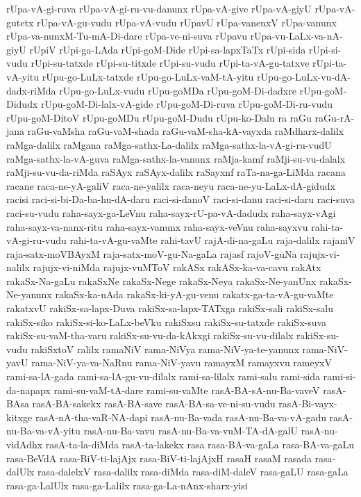 {rUpa-vA-gi-ruva
rUpa-vA-gi-ru-vu-danunx
rUpa-vA-give
rUpa-vA-giyU
rUpa-vA-gutetx
rUpa-vA-gu-vudu
rUpa-vA-vudu
rUpavU
rUpa-vanenxV
rUpa-vanunx
rUpa-va-nunxM-Tu-mA-Di-dare
rUpa-ve-ni-suva
rUpavu
rUpa-vu-LaLx-va-nA-giyU
rUpiV
rUpi-ga-LAda
rUpi-goM-Dide
rUpi-sa-lapxTaTx
rUpi-sida
rUpi-si-vudu
rUpi-su-tatxde
rUpi-su-titxde
rUpi-su-vudu
rUpi-ta-vA-gu-tatxve
rUpi-ta-vA-yitu
rUpu-go-LuLx-tatxde
rUpu-go-LuLx-vaM-tA-yitu
rUpu-go-LuLx-vu-dA-dadx-riMda
rUpu-go-LuLx-vudu
rUpu-goMDa
rUpu-goM-Di-dadxre
rUpu-goM-Didudx
rUpu-goM-Di-lalx-vA-gide
rUpu-goM-Di-ruva
rUpu-goM-Di-ru-vudu
rUpu-goM-DitoV
rUpu-goMDu
rUpu-goM-Dudu
rUpu-ko-Dalu
ra
raGu
raGu-rA-jana
raGu-vaMsha
raGu-vaM-shada
raGu-vaM-sha-kA-vayxda
raMdharx-dalilx
raMga-dalilx
raMgana
raMga-sathx-La-dalilx
raMga-sathx-la-vA-gi-ru-vudU
raMga-sathx-la-vA-guva
raMga-sathx-la-vanunx
raMja-kamf
raMji-su-vu-dalalx
raMji-su-vu-da-riMda
raSAyx
raSAyx-dalilx
raSayxnf
raTa-na-ga-LiMda
racana
racane
raca-ne-yA-galiV
raca-ne-yalilx
raca-neyu
raca-ne-yu-LaLx-dA-gidudx
racisi
raci-si-bi-Da-ba-hu-dA-daru
raci-si-danoV
raci-si-danu
raci-si-daru
raci-suva
raci-su-vudu
raha-sayx-ga-LeVnu
raha-sayx-rU-pa-vA-dadudx
raha-sayx-vAgi
raha-sayx-va-nanx-ritu
raha-sayx-vanunx
raha-sayx-veVnu
raha-sayxvu
rahi-ta-vA-gi-ru-vudu
rahi-ta-vA-gu-vaMte
rahi-tavU
rajA-di-na-gaLu
raja-dalilx
rajaniV
raja-satx-moVBAyxM
raja-satx-moV-gu-Na-gaLa
rajasf
rajoV-guNa
rajujx-vi-nalilx
rajujx-vi-niMda
rajujx-vuMToV
rakASx
rakASx-ka-va-cavu
rakAtx
rakaSx-Na-gaLu
rakaSxNe
rakaSx-Nege
rakaSx-Neya
rakaSx-Ne-yanUnx
rakaSx-Ne-yanunx
rakaSx-ka-nAda
rakaSx-ki-yA-gu-venu
rakatx-ga-ta-vA-gu-vaMte
rakatxvU
rakiSx-sa-lapx-Duva
rakiSx-sa-lapx-TATxga
rakiSx-sali
rakiSx-salu
rakiSx-siko
rakiSx-si-ko-LaLx-beVku
rakiSxsu
rakiSx-su-tatxde
rakiSx-suva
rakiSx-su-vaM-tha-varu
rakiSx-su-vu-da-kAkxgi
rakiSx-su-vu-dilalx
rakiSx-su-vudu
rakiSxtoV
ralilx
ramaNiV
rama-NiVya
rama-NiV-ya-te-yanunx
rama-NiV-yavU
rama-NiV-ya-va-NaRnu
rama-NiV-yavu
ramayxM
ramayxvu
rameyxV
rami-sa-lA-gada
rami-sa-lA-gu-vu-dilalx
rami-sa-lilalx
rami-salu
rami-sida
rami-si-da-napapx
rami-su-vaM-tA-dare
rami-su-vaMte
rasA-BA-sA-nu-Ba-vaveV
rasA-BAsa
rasA-BA-sakekx
rasA-BA-save
rasA-BA-sa-ve-ni-su-vudu
rasA-Bi-vayx-kitxge
rasA-nA-tha-vaR-NA-dapi
rasA-nu-Ba-vada
rasA-nu-Ba-va-vA-gadu
rasA-nu-Ba-va-vA-yitu
rasA-nu-Ba-vavu
rasA-nu-Ba-va-vuM-TA-dA-galU
rasA-nu-vidAdhx
rasA-ta-la-diMda
rasA-ta-lakekx
rasa
rasa-BA-va-gaLa
rasa-BA-va-gaLu
rasa-BeVdA
rasa-BiV-ti-lajAjx
rasa-BiV-ti-lajAjxH
rasaH
rasaM
rasada
rasa-dalUlx
rasa-dalelxV
rasa-dalilx
rasa-diMda
rasa-diM-daleV
rasa-gaLU
rasa-gaLa
rasa-ga-LalUlx
rasa-ga-Lalilx
rasa-ga-La-nAnx-sharx-yisi
}
